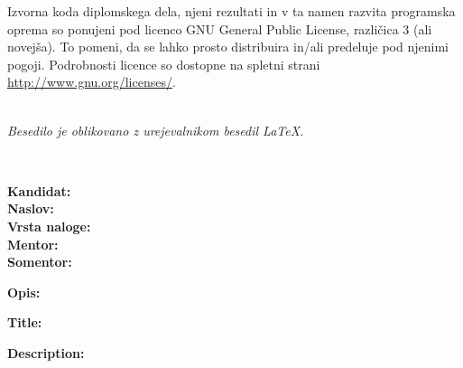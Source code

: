 \vspace*{1cm}
{\small \noindent
  Izvorna koda diplomskega dela, njeni rezultati in v ta namen razvita programska oprema so ponujeni pod licenco GNU General Public License,
  različica 3 (ali novejša). To pomeni, da se lahko prosto distribuira in/ali predeluje pod njenimi pogoji.
  Podrobnosti licence so dostopne na spletni strani \url{http://www.gnu.org/licenses/}.
}

\vfill
\begin{center}
  \ \\ \vfill
  {\em
  Besedilo je oblikovano z urejevalnikom besedil \LaTeX.}
\end{center}

\clearemptydoublepage

\thispagestyle{empty}
\
\vfill

\bigskip
\noindent\textbf{Kandidat:} \tauthor\\
\noindent\textbf{Naslov:} \ttitle\\
\noindent\textbf{Vrsta naloge:} \tvrsta \\
\noindent\textbf{Mentor:} \tmentor \\
\noindent\textbf{Somentor:} \tsomentor

\bigskip
\noindent\textbf{Opis:}\\
\tdescription

\bigskip
\noindent\textbf{Title:} \ttitleEn

\bigskip
\noindent\textbf{Description:}\\
\tdescriptionEn

\vfill

\vspace{2cm}

\clearemptydoublepage

\thispagestyle{empty}\mbox{}\vfill\null\it%
\noindent
\tzahvala
\rm\normalfont
\clearemptydoublepage


\clearemptydoublepage


